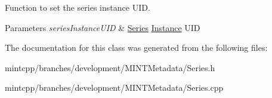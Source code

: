 Function to set the series instance UID. 


\begin{DoxyParams}{Parameters}
{\em seriesInstanceUID} & \hyperlink{class_series}{Series} \hyperlink{class_instance}{Instance} UID \\
\hline
\end{DoxyParams}


The documentation for this class was generated from the following files:\begin{DoxyCompactItemize}
\item 
mintcpp/branches/development/MINTMetadata/Series.h\item 
mintcpp/branches/development/MINTMetadata/Series.cpp\end{DoxyCompactItemize}
